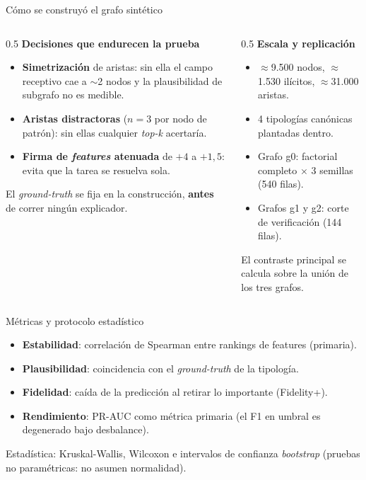 \documentclass[aspectratio=169,11pt]{beamer}
\begin{document}
\begin{frame}{Cómo se construyó el grafo sintético}
\begin{columns}[T]
\begin{column}{0.5\textwidth}
\footnotesize
\textbf{\color{navy}Decisiones que endurecen la prueba}
\begin{itemize}
  \item \textbf{Simetrización} de aristas: sin ella el campo receptivo cae a $\sim$2 nodos y la plausibilidad de subgrafo no es medible.
  \item \textbf{Aristas distractoras} ($n=3$ por nodo de patrón): sin ellas cualquier \emph{top-k} acertaría.
  \item \textbf{Firma de \emph{features} atenuada} de $+4$ a $+1{,}5$: evita que la tarea se resuelva sola.
\end{itemize}
{\color{muted}El \emph{ground-truth} se fija en la construcción, \textbf{antes} de correr ningún explicador.}
\end{column}
\begin{column}{0.5\textwidth}
\footnotesize
\textbf{\color{navy}Escala y replicación}
\begin{itemize}
  \item $\approx$9.500 nodos, $\approx$1.530 ilícitos, $\approx$31.000 aristas.
  \item 4 tipologías canónicas plantadas dentro.
  \item Grafo g0: factorial completo $\times$ 3 semillas (540 filas).
  \item Grafos g1 y g2: corte de verificación (144 filas).
\end{itemize}
{\color{muted}El contraste principal se calcula sobre la unión de los tres grafos.}
\end{column}
\end{columns}
\end{frame}

\begin{frame}{Métricas y protocolo estadístico}
\begin{itemize}
  \item \textbf{\color{teal}Estabilidad}: correlación de Spearman entre rankings de features (primaria).
  \item \textbf{\color{seafoam}Plausibilidad}: coincidencia con el \emph{ground-truth} de la tipología.
  \item \textbf{\color{amber}Fidelidad}: caída de la predicción al retirar lo importante (Fidelity+).
  \item \textbf{\color{coral}Rendimiento}: PR-AUC como métrica primaria (el F1 en umbral es degenerado bajo desbalance).
\end{itemize}
\vspace{0.6em}
\begin{block}{}
\small Estadística: Kruskal-Wallis, Wilcoxon e intervalos de confianza \emph{bootstrap} (pruebas no paramétricas: no asumen normalidad).
\end{block}
\end{frame}
\end{document}
